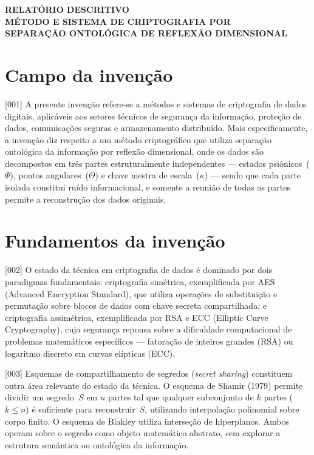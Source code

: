 \documentclass[12pt,a4paper]{article}
\begin{document}
\begin{center}
{\Large\bfseries RELATÓRIO DESCRITIVO}\\[0.8cm]
{\large\bfseries MÉTODO E SISTEMA DE CRIPTOGRAFIA POR\\
SEPARAÇÃO ONTOLÓGICA DE REFLEXÃO DIMENSIONAL}\\[0.8cm]
\end{center}

\section{Campo da invenção}

{[001]} A presente invenção refere-se a métodos e sistemas de
criptografia de dados digitais, aplicáveis aos setores técnicos
de segurança da informação, proteção de dados, comunicações
seguras e armazenamento distribuído. Mais especificamente, a
invenção diz respeito a um método criptográfico que utiliza
separação ontológica da informação por reflexão dimensional,
onde os dados são decompostos em três partes estruturalmente
independentes --- estados psiônicos~($\Psi$), pontos
angulares~($\Theta$) e chave mestra de escala~($\kappa$) ---
sendo que cada parte isolada constitui ruído informacional, e
somente a reunião de todas as partes permite a reconstrução dos
dados originais.

\section{Fundamentos da invenção}

{[002]} O estado da técnica em criptografia de dados é dominado
por dois paradigmas fundamentais: criptografia simétrica,
exemplificada por AES (Advanced Encryption Standard), que
utiliza operações de substituição e permutação sobre blocos de
dados com chave secreta compartilhada; e criptografia
assimétrica, exemplificada por RSA e ECC (Elliptic Curve
Cryptography), cuja segurança repousa sobre a dificuldade
computacional de problemas matemáticos específicos ---
fatoração de inteiros grandes (RSA) ou logaritmo discreto em
curvas elípticas (ECC).

{[003]} Esquemas de compartilhamento de segredos
(\textit{secret sharing}) constituem outra área relevante do
estado da técnica. O esquema de Shamir (1979) permite dividir
um segredo~$S$ em $n$ partes tal que qualquer subconjunto de
$k$ partes ($k \leq n$) é suficiente para reconstruir~$S$,
utilizando interpolação polinomial sobre corpo finito. O
esquema de Blakley utiliza interseção de hiperplanos. Ambos
operam sobre o segredo como objeto matemático abstrato, sem
explorar a estrutura semântica ou ontológica da informação.
\end{document}
